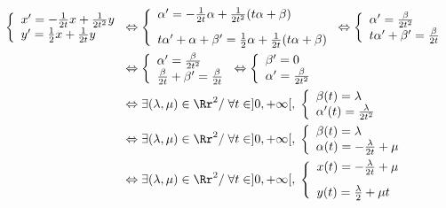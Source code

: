 {\begin{enumerate}
{\begin{align*}\ensuremath
\left\{
\begin{array}{l}
x'=- \frac{1}{2t}x+ \frac{1}{2t^2}y\\
y'= \frac{1}{2}x+ \frac{1}{2t}y
\end{array}
\right.&\Leftrightarrow\left\{
\begin{array}{l}
\alpha'=- \frac{1}{2t}\alpha+ \frac{1}{2t^2}(t\alpha+\beta)\\
\rule{0mm}{6mm}t\alpha'+\alpha+\beta'= \frac{1}{2}\alpha+ \frac{1}{2t}(t\alpha+\beta)
\end{array}
\right.\Leftrightarrow\left\{
\begin{array}{l}
\alpha'= \frac{\beta}{2t^2}\\
t\alpha'+\beta'= \frac{\beta}{2t}
\end{array}
\right.\\
 &\Leftrightarrow\left\{
\begin{array}{l}
\alpha'= \frac{\beta}{2t^2}\\
 \frac{\beta}{2t}+\beta'= \frac{\beta}{2t}
\end{array}
\right.\Leftrightarrow\left\{
\begin{array}{l}
\beta'=0\\
\alpha'= \frac{\beta}{2t^2}
\end{array}
\right.\\
 &\Leftrightarrow\exists(\lambda,\mu)\in\Rr^2/\;\forall t\in]0,+\infty[,\;\left\{
\begin{array}{l}
\beta(t)=\lambda\\
\alpha'(t)= \frac{\lambda}{2t^2}
\end{array}
\right.\\
 &\Leftrightarrow\exists(\lambda,\mu)\in\Rr^2/\;\forall t\in]0,+\infty[,\;\left\{
\begin{array}{l}
\beta(t)=\lambda\\
\alpha(t)=- \frac{\lambda}{2t}+\mu
\end{array}
\right.\\
 &\Leftrightarrow\exists(\lambda,\mu)\in\Rr^2/\;\forall t\in]0,+\infty[,\;\left\{
\begin{array}{l}
x(t)=- \frac{\lambda}{2t}+\mu\\
\rule{0mm}{6mm}y(t)= \frac{\lambda}{2}+\mu t
\end{array}
\right.
\end{align*}

}
\end{enumerate}}
